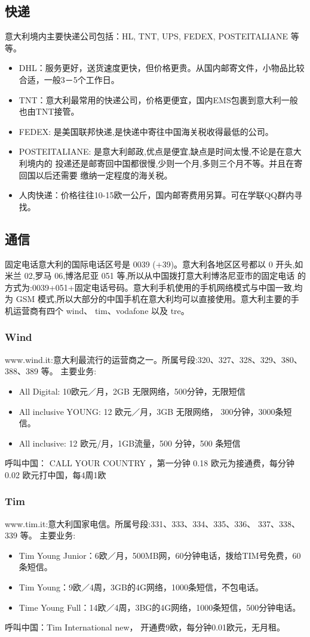 \subsection{快递}
意大利境内主要快递公司包括：HL, TNT, UPS, FEDEX, POSTEITALIANE 等等。
\begin{itemize}
\item DHL：服务更好，送货速度更快，但价格更贵。从国内邮寄文件，小物品比较合适，一般3－5个工作日。
\item TNT：意大利最常用的快递公司，价格更便宜，国内EMS包裹到意大利一般也由TNT接管。
\item FEDEX: 是美国联邦快递,是快递中寄往中国海关税收得最低的公司。
\item POSTEITALIANE: 是意大利邮政,优点是便宜,缺点是时间太慢,不论是在意大利境内的 投递还是邮寄回中国都很慢,少则一个月,多则三个月不等。并且在寄回国以后还需要
缴纳一定程度的海关税。
\item 人肉快递：价格往往10-15欧一公斤，国内邮寄费用另算。可在学联QQ群内寻找。
\end{itemize}

\subsection{通信}
固定电话意大利的国际电话区号是 0039 (+39)。意大利各地区区号都以 0 开头,如米兰 02,罗马 06,博洛尼亚 051 等,所以从中国拨打意大利博洛尼亚市的固定电话 的方式为:0039+051+固定电话号码。意大利手机使用的手机网络模式与中国一致,均为 GSM 模式,所以大部分的中国手机在意大利均可以直接使用。意大利主要的手机运营商有四个 wind、 tim、vodafone 以及 tre。 

\subsubsection{Wind}
www.wind.it:意大利最流行的运营商之一。所属号段:320、327、328、329、380、 388、389 等。
主要业务:
\begin{itemize}
\item All Digital: 10欧元／月，2GB 无限网络，500分钟，无限短信
\item All inclusive YOUNG:  12 欧元／月，3GB 无限网络， 300分钟，3000条短信。
\item All inclusive:  12 欧元/月，1GB流量，500 分钟，500 条短信
\end{itemize}
呼叫中国： CALL YOUR COUNTRY ，第一分钟 0.18 欧元为接通费，每分钟 0.02 欧元打中国，每4周1欧

\subsubsection{Tim}
www.tim.it:意大利国家电信。所属号段:331、333、334、335、336、 337、338、339 等。
主要业务:
\begin{itemize}
\item Tim Young Junior：6欧／月，500MB网，60分钟电话，拨给TIM号免费，60条短信。
\item Tim Young：9欧／4周，3GB的4G网络，1000条短信，不包电话。
\item Time Young Full：14欧／4周，3BG的4G网络，1000条短信，500分钟电话。
\end{itemize}
呼叫中国：Tim International new， 开通费9欧，每分钟0.01欧元，无月租。


